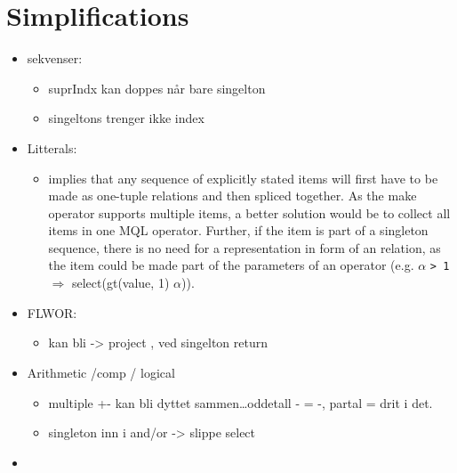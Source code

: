 \section{Simplifications}
\label{sect:trans:TD:simplifications}
\begin{itemize}
  \item sekvenser:
	  \begin{itemize}
	    \item suprIndx kan doppes n\aa r bare singelton
	    \item singeltons trenger ikke index
      \end{itemize} 
  \item Litterals: 
		\begin{itemize}
          \item implies that any sequence of
				explicitly stated items will first have to be made as one-tuple relations and
				then spliced together. As the \textsf{make} operator supports multiple items, a
					better solution would be to collect all items in one MQL operator. Further, if
					the item is part of a singleton sequence, there is no need for a representation
					in form of an relation, as the item could be made part of the parameters of an
					operator (e.g. $\alpha$ \texttt{> 1} $\Longrightarrow$
					\textsf{select(gt(value, 1) $\alpha$)}).   
        \end{itemize}
  \item FLWOR:
  	\begin{itemize}
        \item  kan bli -> project , ved singelton return
      \end{itemize}   
  \item Arithmetic /comp / logical
	\begin{itemize}
      \item multiple +- kan bli dyttet sammen\ldots oddetall - = -, partal = drit i det.
      \item singleton inn i and/or -> slippe select
    \end{itemize}
  \item             
\end{itemize}